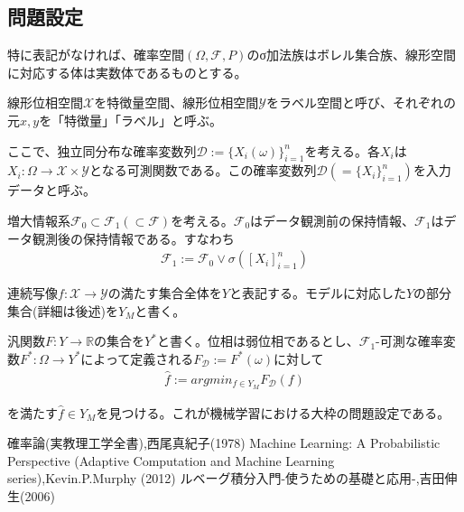 \documentclass{jsarticle}
\begin{document}
\subsection{問題設定}
特に表記がなければ、確率空間$(\Omega,\mathcal{F},P)$のσ加法族はボレル集合族、線形空間に対応する体は実数体であるものとする。

線形位相空間$\mathcal{X}$を特徴量空間、線形位相空間$\mathcal{Y}$をラベル空間と呼び、それぞれの元$x,y$を「特徴量」「ラベル」と呼ぶ。

ここで、独立同分布な確率変数列$\mathcal{D}:=\{X_i(\omega)\}_{i=1}^n$を考える。各$X_i$は$X_i:\Omega\rightarrow\mathcal{X}\times\mathcal{Y}$となる可測関数である。この確率変数列$\mathcal{D}(=\{X_i\}_{i=1}^n)$を入力データと呼ぶ。

増大情報系$\mathcal{F}_0\subset\mathcal{F}_1(\subset\mathcal{F})$を考える。$\mathcal{F}_0$はデータ観測前の保持情報、$\mathcal{F}_1$はデータ観測後の保持情報である。すなわち
\begin{align}
\mathcal{F}_1:=\mathcal{F}_0\vee\sigma([X_i]^n_{i=1})
\end{align}

連続写像$f:\mathcal{X}\rightarrow\mathcal{Y}$の満たす集合全体を$Y$と表記する。モデルに対応した$Y$の部分集合(詳細は後述)を$Y_M$と書く。

汎関数$F:Y\rightarrow\mathbb{R}$の集合を$Y^*$と書く。位相は弱位相であるとし、$\mathcal{F}_1$-可測な確率変数$F^*:\Omega\rightarrow Y^*$によって定義される$F_\mathcal{D}:=F^*(\omega)$に対して
\begin{align}
\hat{f}:=argmin_{f\in Y_M}F_\mathcal{D}(f)
\end{align}

を満たす$\hat{f}\in Y_M$を見つける。これが機械学習における大枠の問題設定である。



\newpage
\begin{thebibliography}{99}
   確率論(実教理工学全書),西尾真紀子(1978)
   Machine Learning: A Probabilistic Perspective (Adaptive Computation and Machine Learning series),Kevin.P.Murphy (2012)
   ルベーグ積分入門-使うための基礎と応用-,吉田伸生(2006)
\end{thebibliography}
\end{document}
